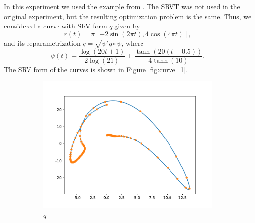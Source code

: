 In this experiment we used the example from \cite[Section 4.2.6]{jørgen2021}. The SRVT was not used in the original experiment, but the resulting optimization problem is the same. Thus, we considered a curve with SRV form \(q\) given by 
\begin{equation*}
    r(t) = \pi [-2 \sin(2\pi t), 4\cos(4\pi t)],
\end{equation*}
and its reparametrization \(q = \sqrt{\psi'}q \circ \psi\), where 
\begin{equation*}
    \psi(t) = \frac{\log(20t + 1)}{2 \log(21)} + \frac{\tanh(20(t - 0.5))}{4 \tanh(10)}.
\end{equation*}
The SRV form of the curves is shown in Figure \ref{fig:curve_1}. 

\begin{figure}[b]
    \begin{subfigure}[t]{0.5\textwidth}
        \centering
        \includegraphics[width=\linewidth]{figures/curve_1/curve_q.pdf}
        \caption{\(q\)}\label{fig:curve_1_q}
    \end{subfigure}
    \begin{subfigure}[t]{0.5\textwidth}

\end{subfigure}
\end{figure}
